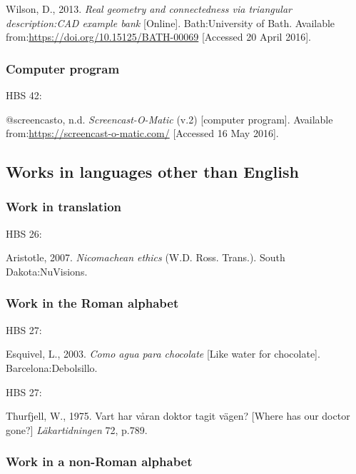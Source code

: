 Wilson, D., 2013. \emph{Real geometry and connectedness via triangular description:\@ CAD example bank} [Online]. Bath:\@ University of Bath. Available from:\@ \url{https://doi.org/10.15125/BATH-00069} [Accessed 20 April 2016].



\subsubsection*{Computer program}

HBS 42: \cite{screencasto}

@screencasto, n.d. \emph{Screencast-O-Matic} (v.2) [computer program]. Available from:\@ \url{https://screencast-o-matic.com/} [Accessed 16 May 2016].



\subsection{Works in languages other than English}

\subsubsection*{Work in translation}

HBS 26: \cite{aristotle2007ne}

Aristotle, 2007. \emph{Nicomachean ethics} (W.D. Ross. Trans.). South Dakota:\@ NuVisions.



\subsubsection*{Work in the Roman alphabet}

HBS 27: \cite{esquivel2003cap}

Esquivel, L., 2003. \emph{Como agua para chocolate} [Like water for chocolate]. Barcelona:\@ Debolsillo.



HBS 27: \cite{thurfjell1975vhv}

Thurfjell, W., 1975. Vart har våran doktor tagit vägen? [Where has our doctor gone?] \emph{Läkartidningen} 72, p.789.



\subsubsection*{Work in a non-Roman alphabet}


